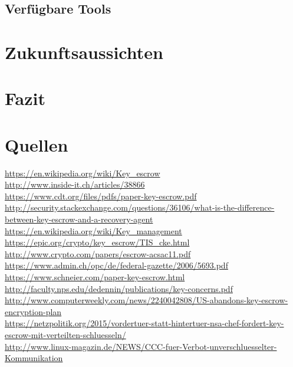 \documentclass[a4paper, 10pt, fleqn]{article}
\begin{document}
	\subsection{Verfügbare Tools}
\clearpage
\section{Zukunftsaussichten}
\clearpage
\section{Fazit}
\clearpage
\section*{Quellen}
\url{https://en.wikipedia.org/wiki/Key_escrow}\\
\url{http://www.inside-it.ch/articles/38866}\\
\url{https://www.cdt.org/files/pdfs/paper-key-escrow.pdf}\\
\url{http://security.stackexchange.com/questions/36106/what-is-the-difference-between-key-escrow-and-a-recovery-agent}\\
\url{https://en.wikipedia.org/wiki/Key_management}\\
\url{https://epic.org/crypto/key_escrow/TIS_cke.html}\\
\url{http://www.crypto.com/papers/escrow-acsac11.pdf}\\
\url{https://www.admin.ch/opc/de/federal-gazette/2006/5693.pdf} \\ %
\url{https://www.schneier.com/paper-key-escrow.html} \\ %
\url{http://faculty.nps.edu/dedennin/publications/key-concerns.pdf} \\ %
\url{http://www.computerweekly.com/news/2240042808/US-abandons-key-escrow-encryption-plan} \\ %
\url{https://netzpolitik.org/2015/vordertuer-statt-hintertuer-nsa-chef-fordert-key-escrow-mit-verteilten-schluesseln/} \\ %
\url{http://www.linux-magazin.de/NEWS/CCC-fuer-Verbot-unverschluesselter-Kommunikation} \\ %
\end{document}

